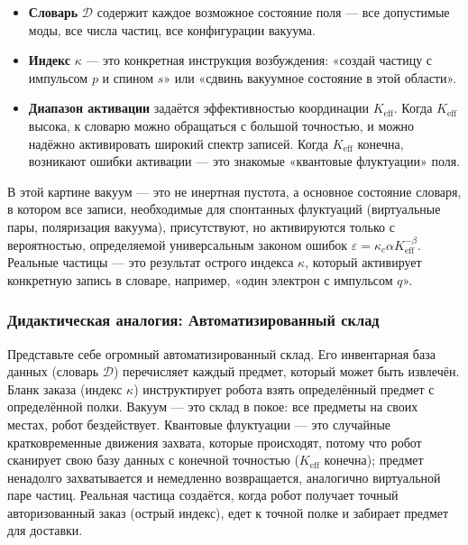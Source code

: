 \documentclass[12pt,a4paper]{article}
\theoremstyle{remark}
\begin{document}
	\begin{itemize}[leftmargin=*]
		\item \textbf{Словарь} $\mathcal{D}$ содержит каждое возможное состояние поля — все допустимые моды, все числа частиц, все конфигурации вакуума.
		\item \textbf{Индекс} $\kappa$ — это конкретная инструкция возбуждения: «создай частицу с импульсом $p$ и спином $s$» или «сдвинь вакуумное состояние в этой области».
		\item \textbf{Диапазон активации} задаётся эффективностью координации $K_{\mathrm{eff}}$. Когда $K_{\mathrm{eff}}$ высока, к словарю можно обращаться с большой точностью, и можно надёжно активировать широкий спектр записей. Когда $K_{\mathrm{eff}}$ конечна, возникают ошибки активации — это знакомые «квантовые флуктуации» поля.
	\end{itemize}
	
	В этой картине вакуум — это не инертная пустота, а основное состояние словаря, в котором все записи, необходимые для спонтанных флуктуаций (виртуальные пары, поляризация вакуума), присутствуют, но активируются только с вероятностью, определяемой универсальным законом ошибок $\varepsilon = \kappa_c \alpha K_{\mathrm{eff}}^{-\beta}$. Реальные частицы — это результат острого индекса $\kappa$, который активирует конкретную запись в словаре, например, «один электрон с импульсом $q$».
	
	\subsubsection{Дидактическая аналогия: Автоматизированный склад}
	
	Представьте себе огромный автоматизированный склад. Его инвентарная база данных (словарь $\mathcal{D}$) перечисляет каждый предмет, который может быть извлечён. Бланк заказа (индекс $\kappa$) инструктирует робота взять определённый предмет с определённой полки. Вакуум — это склад в покое: все предметы на своих местах, робот бездействует. Квантовые флуктуации — это случайные кратковременные движения захвата, которые происходят, потому что робот сканирует свою базу данных с конечной точностью ($K_{\mathrm{eff}}$ конечна); предмет ненадолго захватывается и немедленно возвращается, аналогично виртуальной паре частиц. Реальная частица создаётся, когда робот получает точный авторизованный заказ (острый индекс), едет к точной полке и забирает предмет для доставки.
	
	\medskip
	
\end{document}
